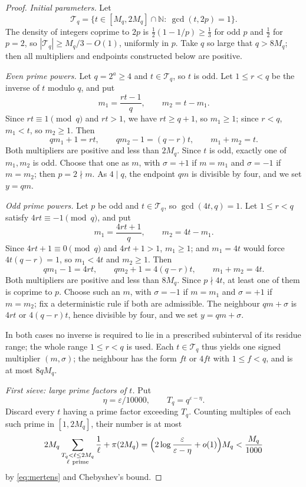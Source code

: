 \documentclass[11pt,letterpaper]{article}
\numberwithin{equation}{section}
\theoremstyle{plain}
\theoremstyle{remark}
\newcommand{\N}{\mathbb N}
\newcommand{\cT}{\mathcal T}
\begin{document}
\begin{proof}
\emph{Initial parameters.} Let
\[
\cT_q=\{t\in[M_q,2M_q]\cap\N:\ \gcd(t,2p)=1\}.
\]
The density of integers coprime to $2p$ is $\tfrac12(1-1/p)\ge\tfrac13$ for odd $p$ and $\tfrac12$ for $p=2$, so $|\cT_q|\ge M_q/3-O(1)$, uniformly in $p$. Take $q$ so large that $q>8M_q$; then all multipliers and endpoints constructed below are positive.

\emph{Even prime powers.} Let $q=2^a\ge4$ and $t\in\cT_q$, so $t$ is odd. Let $1\le r<q$ be the inverse of $t$ modulo $q$, and put
\[
m_1=\frac{rt-1}q,\qquad m_2=t-m_1 .
\]
Since $rt\equiv1\pmod q$ and $rt>1$, we have $rt\ge q+1$, so $m_1\ge1$; since $r<q$, $m_1<t$, so $m_2\ge1$. Then
\begin{equation}\label{eq:S5}
qm_1+1=rt,\qquad qm_2-1=(q-r)t,\qquad m_1+m_2=t .
\end{equation}
Both multipliers are positive and less than $2M_q$. Since $t$ is odd, exactly one of $m_1,m_2$ is odd. Choose that one as $m$, with $\sigma=+1$ if $m=m_1$ and $\sigma=-1$ if $m=m_2$; then $p=2\nmid m$. As $4\mid q$, the endpoint $qm$ is divisible by four, and we set $y=qm$.

\emph{Odd prime powers.} Let $p$ be odd and $t\in\cT_q$, so $\gcd(4t,q)=1$. Let $1\le r<q$ satisfy $4rt\equiv-1\pmod q$, and put
\[
m_1=\frac{4rt+1}q,\qquad m_2=4t-m_1 .
\]
Since $4rt+1\equiv0\pmod q$ and $4rt+1>1$, $m_1\ge1$; and $m_1=4t$ would force $4t(q-r)=1$, so $m_1<4t$ and $m_2\ge1$. Then
\begin{equation}\label{eq:S6}
qm_1-1=4rt,\qquad qm_2+1=4(q-r)t,\qquad m_1+m_2=4t .
\end{equation}
Both multipliers are positive and less than $8M_q$. Since $p\nmid4t$, at least one of them is coprime to $p$. Choose such an $m$, with $\sigma=-1$ if $m=m_1$ and $\sigma=+1$ if $m=m_2$; fix a deterministic rule if both are admissible. The neighbour $qm+\sigma$ is $4rt$ or $4(q-r)t$, hence divisible by four, and we set $y=qm+\sigma$.

In both cases no inverse is required to lie in a prescribed subinterval of its residue range; the whole range $1\le r<q$ is used. Each $t\in\cT_q$ thus yields one signed multiplier $(m,\sigma)$; the neighbour has the form $ft$ or $4ft$ with $1\le f<q$, and is at most $8qM_q$.

\emph{First sieve: large prime factors of $t$.} Put
\[
\eta=\varepsilon/10000,\qquad T_q=q^{\varepsilon-\eta}.
\]
Discard every $t$ having a prime factor exceeding $T_q$. Counting multiples of each such prime in $[1,2M_q]$, their number is at most
\begin{equation}\label{eq:S7}
2M_q\sum_{\substack{T_q<\ell\le2M_q\\ \ell\ \text{prime}}}\frac1\ell+\pi(2M_q)
=\Bigl(2\log\frac{\varepsilon}{\varepsilon-\eta}+o(1)\Bigr)M_q<\frac{M_q}{1000}
\end{equation}
by \eqref{eq:mertens} and Chebyshev's bound.


\end{proof}
\end{document}
